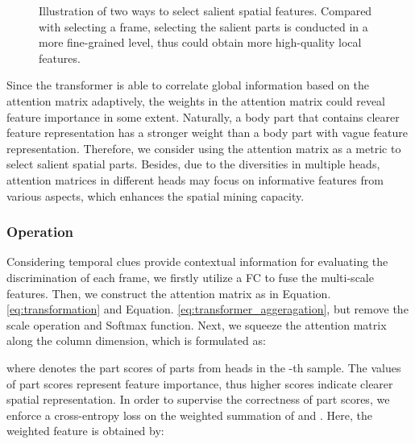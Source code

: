 \documentclass[journal]{IEEEtran}
\begin{document}
  \begin{figure}[t]
    \centering  {}
    
    \caption{Illustration of two ways to select salient spatial features. Compared with selecting a frame, selecting the salient parts is conducted in a more fine-grained level, thus could obtain more high-quality local features.}    \label{fig:illustration_SSFL}    \end{figure}
 
 Since the transformer is able to correlate global information based on the attention matrix adaptively, the weights in the attention matrix could reveal feature importance in some extent. Naturally, a body part that contains clearer feature representation has a stronger weight than a body part with vague feature representation. Therefore, we consider using the attention matrix as a metric to select salient spatial parts. Besides, due to the diversities in multiple heads\cite{transformer}, attention matrices in different heads may focus on informative features from various aspects, which enhances the spatial mining capacity.
 
 \subsubsection{Operation} Considering temporal clues provide contextual information for evaluating the discrimination of each frame, we firstly utilize a FC to fuse the multi-scale features. Then, we construct the attention matrix  as in Equation. \ref{eq:transformation} and Equation. \ref{eq:transformer_aggeragation}, but remove the scale operation and Softmax function. Next, we squeeze the attention matrix along the column dimension, which is formulated as:
 
 where  denotes the part scores of  parts from  heads in the -th sample. The values of part scores represent feature importance, thus higher scores indicate clearer spatial representation. In order to supervise the correctness of part scores, we enforce a cross-entropy loss on the weighted summation of  and . Here, the weighted feature  is obtained by:
\end{document}
